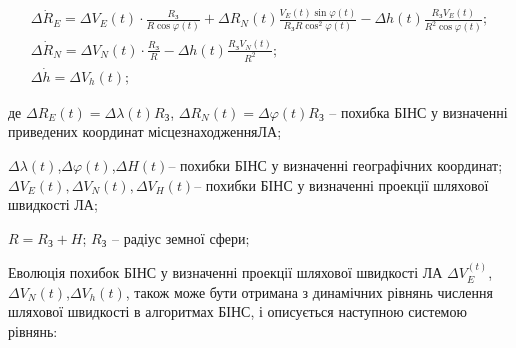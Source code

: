 \begin{equation} 
\label{eq:dRsdins} 
\begin{array}{l} 
{\Delta \dot{R}_{E} =\Delta V_{E}(t)\cdot \frac{R_{\text{З}} }{R\cos \varphi (t)} 
+\Delta R_{N} (t)\frac{V_{E}^{}(t)\sin \varphi (t)}{R_{\text{З}} R\cos ^{2} \varphi (t)} 
-\Delta h(t)\frac{R_{\text{З}} V_{E}^{}(t)}{R^{2} \cos \varphi (t)} ;} \\ 
{\Delta \dot{R}_{N} =\Delta V_{N}(t)\cdot \frac{R_{\text{З}}}{R} -\Delta h(t)\frac{R_{\text{З}} V_{N}(t)}{R^{2}};} \\ 
{\Delta \dot{h} =\Delta V_{h} (t);} \end{array} \end{equation} 
\begin{ESKDexplanation}
\item де $\Delta R_{E} (t)=\Delta \lambda (t)R_{\text{З}}$, $\Delta R_{N}(t)=\Delta\varphi(t)R_{\text{З}} $
-- похибка БІНС у визначенні приведених координат місцезнаходженняЛА; 
\item $\Delta \lambda(t)$,$\Delta \varphi (t)$,$\Delta H(t)$-- похибки БІНС у визначенні 
географічних координат; $\Delta V_{E}(t),\Delta V_{N}(t),\Delta V_{H}(t)$-- похибки 
БІНС у визначенні проекції шляхової швидкості ЛА; 
\item $R=R_{\text{З}}+H$; $R_{\text{З}}$  -- радіус земної сфери; 
\end{ESKDexplanation}
Еволюція похибок БІНС у визначенні проекції шляхової швидкості ЛА $\Delta V_{E}^(t)$,
$\Delta V_{N}(t)$,$\Delta V_{h}(t)$, також може бути отримана з динамічних 
рівнянь числення шляхової швидкості в алгоритмах БІНС, і описується наступною системою 
рівнянь: 
